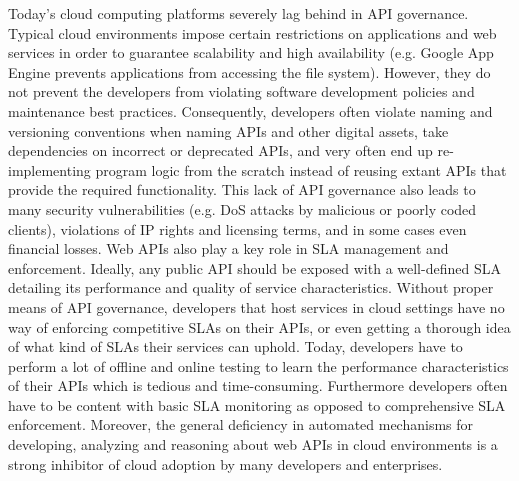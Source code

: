 Today's cloud computing platforms severely lag behind in 
API governance. Typical cloud environments impose certain restrictions
on applications and web services in order to guarantee scalability
and high availability (e.g. Google App Engine prevents applications from accessing
the file system). 
However, they do not prevent the developers from violating
software development policies and maintenance best practices. 
Consequently, developers often violate naming and versioning conventions
when naming APIs and other digital assets, take dependencies
on incorrect or deprecated APIs, and very often end up re-implementing program logic
from the scratch instead of reusing extant APIs that provide the required functionality.
This lack of API governance also leads to many security vulnerabilities (e.g. DoS attacks
by malicious or poorly coded clients), violations of IP rights and licensing terms, and in
some cases even financial losses. Web APIs also play a key role in SLA
management and enforcement. Ideally, any public API should be exposed with a well-defined
SLA detailing its performance and quality of service characteristics. Without proper means
of API governance, developers that host services in cloud settings have no way of enforcing
competitive SLAs on their APIs, or even getting a thorough idea of what kind of SLAs
their services can uphold. Today, developers have to perform a lot of offline
and online testing to learn the performance characteristics of their APIs which is tedious and
time-consuming. Furthermore developers often have to be content with basic SLA monitoring 
as opposed to comprehensive SLA enforcement. Moreover, the general deficiency in
automated mechanisms for developing, analyzing and reasoning 
about web APIs in cloud environments
is a strong inhibitor of cloud adoption by many developers and enterprises.

